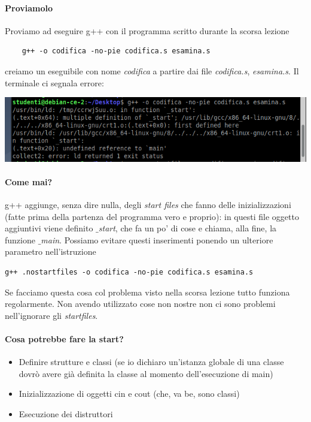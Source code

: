 \documentclass[11pt]{report}
\theoremstyle{definition}
\begin{document}
\paragraph{Proviamolo} Proviamo ad eseguire g++ con il programma scritto durante la scorsa lezione 
\begin{verbatim}
	g++ -o codifica -no-pie codifica.s esamina.s
\end{verbatim}
creiamo un eseguibile con nome \emph{codifica} a partire dai file \emph{codifica.s}, \emph{esamina.s}. Il terminale ci segnala errore:
\begin{center}
	\includegraphics[scale=.9]{img/150.PNG}
\end{center} 
\paragraph{Come mai?} g++ aggiunge, senza dire nulla, degli \emph{start files} che fanno delle inizializzazioni (fatte prima della partenza del programma vero e proprio): in questi file oggetto aggiuntivi viene definito \emph{$\_$start}, che fa un po' di cose e chiama, alla fine, la funzione \emph{$\_$main}. Possiamo evitare questi inserimenti ponendo un ulteriore parametro nell'istruzione
\begin{verbatim}
g++ .nostartfiles -o codifica -no-pie codifica.s esamina.s
\end{verbatim}
Se facciamo questa cosa col problema visto nella scorsa lezione tutto funziona regolarmente. Non avendo utilizzato cose non nostre non ci sono problemi nell'ignorare gli \emph{startfiles}.
\paragraph{Cosa potrebbe fare la start?}
\begin{itemize}
\item Definire strutture e classi (se io dichiaro un'istanza globale di una classe dovrò avere già definita la classe al momento dell'esecuzione di main)
\item Inizializzazione di oggetti cin e cout (che, va be, sono classi)
\item Esecuzione dei distruttori
\end{itemize}
\end{document}
